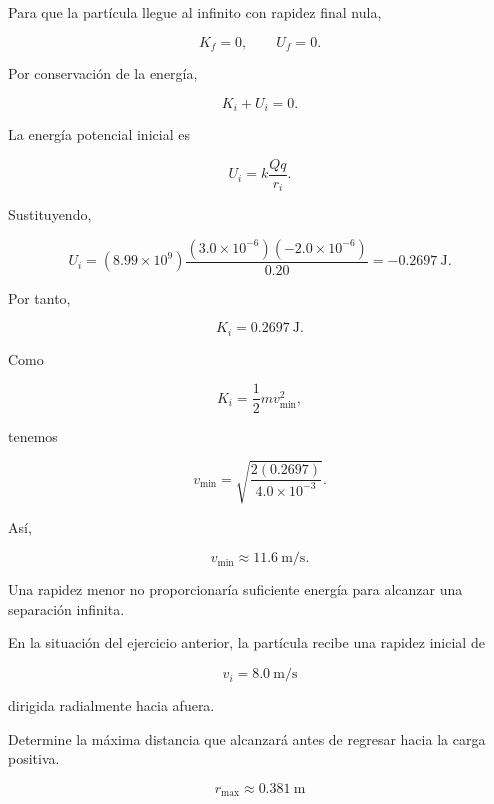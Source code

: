 \begin{explicacion}

Para que la partícula llegue al infinito con rapidez final nula,

\[
K_f=0,
\qquad
U_f=0.
\]

Por conservación de la energía,

\[
K_i+U_i=0.
\]

La energía potencial inicial es

\[
U_i
=
k\frac{Qq}{r_i}.
\]

Sustituyendo,

\[
U_i
=
(8.99\times10^9)
\frac{(3.0\times10^{-6})(-2.0\times10^{-6})}{0.20}
=
-\SI{0.2697}{\joule}.
\]

Por tanto,

\[
K_i=\SI{0.2697}{\joule}.
\]

Como

\[
K_i=\frac12mv_{\min}^2,
\]

tenemos

\[
v_{\min}
=
\sqrt{
\frac{2(0.2697)}
{4.0\times10^{-3}}
}.
\]

Así,

\[
\boxed{v_{\min}\approx\SI{11.6}{\metre\per\second}}.
\]

Una rapidez menor no proporcionaría suficiente energía para alcanzar una separación
infinita.

\end{explicacion}


\begin{ejercicio}

En la situación del ejercicio anterior, la partícula recibe una rapidez inicial de

\[
v_i=\SI{8.0}{\metre\per\second}
\]

dirigida radialmente hacia afuera.

Determine la máxima distancia que alcanzará antes de regresar hacia la carga positiva.

\end{ejercicio}

\begin{respuesta}

\[
\boxed{r_{\max}\approx\SI{0.381}{\metre}}
\]

\end{respuesta}

